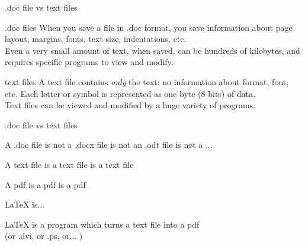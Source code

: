 \documentclass[xcolor=dvipsnames]{beamer}
\begin{document}
\begin{frame}{.doc file vs text files}
  \pause
  \begin{block}{.doc files}
    When you save a file in .doc format, you save information about page layout,
    margins, fonts, text size, indentations, etc.\\
    \pause
    Even a very small amount of text, when saved, can be hundreds of kilobytes,
    and requires specific programs to view and modify. 
  \end{block}
  \pause
  \begin{block}{text files}
    A text file contains \emph{only} the text: no information about format,
    font, etc. Each letter or symbol is represented as one byte (8 bits) of data. \\
    \pause
    Text files can be viewed and modified by a huge variety of programs. 
  \end{block}
\end{frame}


\begin{frame}{.doc file vs text files}
  \begin{block}{}
    A .doc file is not a .docx file is not an .odt file is not a ...
  \end{block}
  \pause

  \begin{block}{}
    A text file is a text file is a text file
  \end{block}
  \pause
  
  \begin{block}{}
    A pdf is a pdf is a pdf
  \end{block}
\end{frame}
  

\begin{frame}{\LaTeX{} is...}
  \pause
  \begin{block}{}
    \LaTeX{} is a program which turns a text file into a pdf \\ 
    (or .dvi, or .ps, or... )
  \end{block}
\end{frame}
\end{document}

